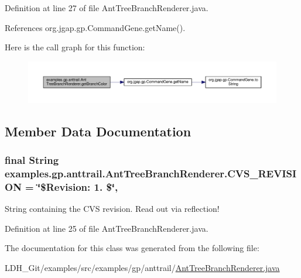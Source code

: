 Definition at line 27 of file Ant\-Tree\-Branch\-Renderer.\-java.



References org.\-jgap.\-gp.\-Command\-Gene.\-get\-Name().



Here is the call graph for this function\-:
\nopagebreak
\begin{figure}[H]
\begin{center}
\leavevmode
\includegraphics[width=350pt]{classexamples_1_1gp_1_1anttrail_1_1_ant_tree_branch_renderer_aea55fc81cf7b57343e5627a55bd1f7fc_cgraph}
\end{center}
\end{figure}




\subsection{Member Data Documentation}
\hypertarget{classexamples_1_1gp_1_1anttrail_1_1_ant_tree_branch_renderer_a1f9d9b25e58b2232dab7530769322849}{
\subsubsection[{C\-V\-S\-\_\-\-R\-E\-V\-I\-S\-I\-O\-N}]{\setlength{\rightskip}{0pt plus 5cm}final String examples.\-gp.\-anttrail.\-Ant\-Tree\-Branch\-Renderer.\-C\-V\-S\-\_\-\-R\-E\-V\-I\-S\-I\-O\-N = \char`\"{}\$Revision\-: 1. \$\char`\"{}\hspace{0.3cm}{\ttfamily [static]}, {\ttfamily [private]}}}\label{classexamples_1_1gp_1_1anttrail_1_1_ant_tree_branch_renderer_a1f9d9b25e58b2232dab7530769322849}
String containing the C\-V\-S revision. Read out via reflection! 

Definition at line 25 of file Ant\-Tree\-Branch\-Renderer.\-java.



The documentation for this class was generated from the following file\-:\begin{DoxyCompactItemize}
\item 
L\-D\-H\-\_\-\-Git/examples/src/examples/gp/anttrail/\hyperlink{_ant_tree_branch_renderer_8java}{Ant\-Tree\-Branch\-Renderer.\-java}\end{DoxyCompactItemize}
